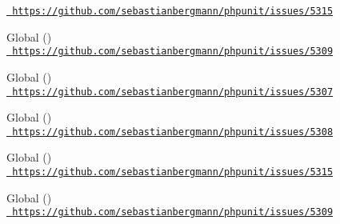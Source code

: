 \begin{DoxyRefList}
\label{deprecated__deprecated000034}%
%
\href{https://github.com/sebastianbergmann/phpunit/issues/5315}{\texttt{ https\+://github.\+com/sebastianbergmann/phpunit/issues/5315}}  
\item[Global \doxylink{class_p_h_p_unit_1_1_framework_1_1_mock_object_1_1_mock_builder_a99413480c96935be683033999da633d7}{Mock\+Builder\+::disable\+Autoload} ()]\hfill \\
\label{deprecated__deprecated000032}%
%
\href{https://github.com/sebastianbergmann/phpunit/issues/5309}{\texttt{ https\+://github.\+com/sebastianbergmann/phpunit/issues/5309}} 
\item[Global \doxylink{class_p_h_p_unit_1_1_framework_1_1_mock_object_1_1_mock_builder_a8be4afab6735166785c02ebe100fbc81}{Mock\+Builder\+::disable\+Proxying\+To\+Original\+Methods} ()]\hfill \\
\label{deprecated__deprecated000037}%
%
\href{https://github.com/sebastianbergmann/phpunit/issues/5307}{\texttt{ https\+://github.\+com/sebastianbergmann/phpunit/issues/5307}}  
\item[Global \doxylink{class_p_h_p_unit_1_1_framework_1_1_mock_object_1_1_mock_builder_ae3c9fc9227b7c747c0612844107f476f}{Mock\+Builder\+::disallow\+Mocking\+Unknown\+Types} ()]\hfill \\
\label{deprecated__deprecated000040}%
%
\href{https://github.com/sebastianbergmann/phpunit/issues/5308}{\texttt{ https\+://github.\+com/sebastianbergmann/phpunit/issues/5308}}  
\item[Global \doxylink{class_p_h_p_unit_1_1_framework_1_1_mock_object_1_1_mock_builder_a8e48ca0c7e6a7a3a55018e8b1767050e}{Mock\+Builder\+::enable\+Argument\+Cloning} ()]\hfill \\
\label{deprecated__deprecated000035}%
%
\href{https://github.com/sebastianbergmann/phpunit/issues/5315}{\texttt{ https\+://github.\+com/sebastianbergmann/phpunit/issues/5315}}  
\item[Global \doxylink{class_p_h_p_unit_1_1_framework_1_1_mock_object_1_1_mock_builder_a0ba499758ad2a729532aabad1fbb0abe}{Mock\+Builder\+::enable\+Autoload} ()]\hfill \\
\label{deprecated__deprecated000033}%
%
\href{https://github.com/sebastianbergmann/phpunit/issues/5309}{\texttt{ https\+://github.\+com/sebastianbergmann/phpunit/issues/5309}}  

\end{DoxyRefList}

